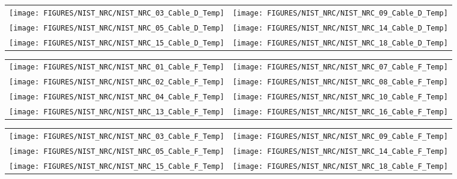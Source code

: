 \begin{figure}[p]
\begin{tabular*}{\textwidth}{l@{\extracolsep{\fill}}r}
\texttt{[image: FIGURES/NIST\_NRC/NIST\_NRC\_03\_Cable\_D\_Temp]} &
\texttt{[image: FIGURES/NIST\_NRC/NIST\_NRC\_09\_Cable\_D\_Temp]} \\
\texttt{[image: FIGURES/NIST\_NRC/NIST\_NRC\_05\_Cable\_D\_Temp]} &
\texttt{[image: FIGURES/NIST\_NRC/NIST\_NRC\_14\_Cable\_D\_Temp]} \\
\texttt{[image: FIGURES/NIST\_NRC/NIST\_NRC\_15\_Cable\_D\_Temp]} &
\texttt{[image: FIGURES/NIST\_NRC/NIST\_NRC\_18\_Cable\_D\_Temp]}
\end{tabular*}
\label{NIST_NRC_Cable_D_Open}
\end{figure}

\begin{figure}[p]
\begin{tabular*}{\textwidth}{l@{\extracolsep{\fill}}r}
\texttt{[image: FIGURES/NIST\_NRC/NIST\_NRC\_01\_Cable\_F\_Temp]} &
\texttt{[image: FIGURES/NIST\_NRC/NIST\_NRC\_07\_Cable\_F\_Temp]} \\
\texttt{[image: FIGURES/NIST\_NRC/NIST\_NRC\_02\_Cable\_F\_Temp]} &
\texttt{[image: FIGURES/NIST\_NRC/NIST\_NRC\_08\_Cable\_F\_Temp]} \\
\texttt{[image: FIGURES/NIST\_NRC/NIST\_NRC\_04\_Cable\_F\_Temp]} &
\texttt{[image: FIGURES/NIST\_NRC/NIST\_NRC\_10\_Cable\_F\_Temp]} \\
\texttt{[image: FIGURES/NIST\_NRC/NIST\_NRC\_13\_Cable\_F\_Temp]} &
\texttt{[image: FIGURES/NIST\_NRC/NIST\_NRC\_16\_Cable\_F\_Temp]}
\end{tabular*}
\label{NIST_NRC_Cable_F_Closed}
\end{figure}

\begin{figure}[p]
\begin{tabular*}{\textwidth}{l@{\extracolsep{\fill}}r}
\texttt{[image: FIGURES/NIST\_NRC/NIST\_NRC\_03\_Cable\_F\_Temp]} &
\texttt{[image: FIGURES/NIST\_NRC/NIST\_NRC\_09\_Cable\_F\_Temp]} \\
\texttt{[image: FIGURES/NIST\_NRC/NIST\_NRC\_05\_Cable\_F\_Temp]} &
\texttt{[image: FIGURES/NIST\_NRC/NIST\_NRC\_14\_Cable\_F\_Temp]} \\
\texttt{[image: FIGURES/NIST\_NRC/NIST\_NRC\_15\_Cable\_F\_Temp]} &
\texttt{[image: FIGURES/NIST\_NRC/NIST\_NRC\_18\_Cable\_F\_Temp]}
\end{tabular*}
\label{NIST_NRC_Cable_F_Open}
\end{figure}

